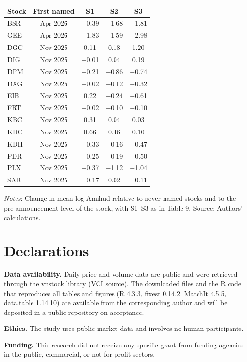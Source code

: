 \begin{longtable}[]{@{}lcccc@{}}
\toprule\noalign{}
Stock & First named & S1 & S2 & S3 \\
\midrule\noalign{}
\endhead
\bottomrule\noalign{}
\endlastfoot
BSR & Apr 2026 & −0.39 & −1.68 & −1.81 \\
GEE & Apr 2026 & −1.83 & −1.59 & −2.98 \\
DGC & Nov 2025 & 0.11 & 0.18 & 1.20 \\
DIG & Nov 2025 & −0.01 & 0.04 & 0.19 \\
DPM & Nov 2025 & −0.21 & −0.86 & −0.74 \\
DXG & Nov 2025 & −0.02 & −0.12 & −0.32 \\
EIB & Nov 2025 & 0.22 & −0.24 & −0.61 \\
FRT & Nov 2025 & −0.02 & −0.10 & −0.10 \\
KBC & Nov 2025 & 0.31 & 0.04 & 0.03 \\
KDC & Nov 2025 & 0.66 & 0.46 & 0.10 \\
KDH & Nov 2025 & −0.33 & −0.16 & −0.47 \\
PDR & Nov 2025 & −0.25 & −0.19 & −0.50 \\
PLX & Nov 2025 & −0.37 & −1.12 & −1.04 \\
SAB & Nov 2025 & −0.17 & 0.02 & −0.11 \\
\end{longtable}

\emph{Notes}: Change in mean log Amihud relative to never-named stocks
and to the pre-announcement level of the stock, with S1--S3 as in Table
9. Source: Authors' calculations.

\hypertarget{declarations}{%
\section{Declarations}\label{declarations}}

\textbf{Data availability.} Daily price and volume data are public and
were retrieved through the vnstock library (VCI source). The downloaded
files and the R code that reproduces all tables and figures (R 4.3.3,
fixest 0.14.2, MatchIt 4.5.5, data.table 1.14.10) are available from the
corresponding author and will be deposited in a public repository on
acceptance.

\textbf{Ethics.} The study uses public market data and involves no human
participants.

\textbf{Funding.} This research did not receive any specific grant from
funding agencies in the public, commercial, or not-for-profit sectors.

